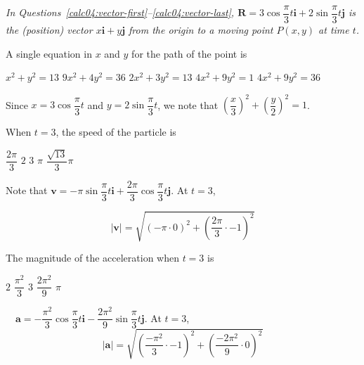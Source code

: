 \newpage




\begin{EnvFullwidth}
\textit{In Questions~\ref{calc04:vector-first}--\ref{calc04:vector-last}, $\mathbf{R}=3 \cos \dfrac{\pi}{3} t \mathbf{i}+2 \sin \dfrac{\pi}{3} t \mathbf{j}$ is the (position) vector $x \mathbf{i}+y \mathbf{j}$ from the origin to a moving point $P(x, y)$ at time $t$.}
\end{EnvFullwidth}

\question\label{calc04:vector-first}
A single equation in $x$ and $y$ for the path of the point is
\begin{choices}
  \choice $x^{2}+y^{2}=13$
  \choice $9 x^{2}+4 y^{2}=36$
  \choice $2 x^{2}+3 y^{2}=13$
  \choice $4 x^{2}+9 y^{2}=1$
  \CorrectChoice $4 x^{2}+9 y^{2}=36$
\end{choices}
\begin{solution}
Since $x=3 \cos \dfrac{\pi}{3} t$ and $y=2 \sin \dfrac{\pi}{3} t$, we note that $\left(\dfrac{x}{3}\right)^{2}+\left(\dfrac{y}{2}\right)^{2}=1$.
\end{solution}

\question
When $t=3$, the speed of the particle is
\begin{choices}
  \CorrectChoice $\dfrac{2 \pi}{3}$
  \choice $2$
  \choice $3$
  \choice $\pi$
  \choice $\dfrac{\sqrt{13}}{3} \pi$
\end{choices}
\begin{solution}
Note that $\mathbf{v}=-\pi \sin \dfrac{\pi}{3} t \mathbf{i}+\dfrac{2 \pi}{3} \cos \dfrac{\pi}{3} t \mathbf{j}$. At $t=3$,


\[
|\mathbf{v}|=\sqrt{(-\pi \cdot 0)^{2}+\left(\dfrac{2 \pi}{3} \cdot-1\right)^{2}}
\]


  \setcounter{enumi}{28}
\end{solution}

\question
The magnitude of the acceleration when $t=3$ is
\begin{choices}
  \choice $2$
  \CorrectChoice $\dfrac{\pi^{2}}{3}$
  \choice $3$
  \choice $\dfrac{2 \pi^{2}}{9}$
  \choice $\pi$
\end{choices}
\begin{solution}
$\quad \mathbf{a}=-\dfrac{\pi^{2}}{3} \cos \dfrac{\pi}{3} t \mathbf{i}-\dfrac{2 \pi^{2}}{9} \sin \dfrac{\pi}{3} t \mathbf{j}$. At $t=3$,
\[
|\mathbf{a}|=\sqrt{\left(\dfrac{-\pi^{2}}{3} \cdot-1\right)^{2}+\left(\dfrac{-2 \pi^{2}}{9} \cdot 0\right)^{2}}
\]
\end{solution}





